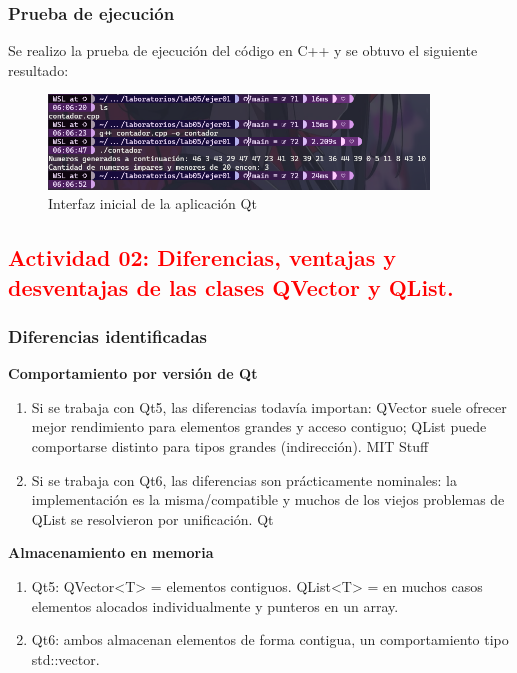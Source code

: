 \subsubsection{Prueba de ejecución}

Se realizo la prueba de ejecución del código en C++ y se obtuvo el siguiente resultado:

\begin{figure}[H]
    \centering
    \includegraphics[width=0.9\textwidth]{img/Prueba01.png}
    \caption{Interfaz inicial de la aplicación Qt}
    \label{fig:qt_app}
\end{figure}




\subsection{\textcolor{red}{Actividad 02: Diferencias, ventajas y desventajas de las clases QVector y QList.}}

\subsubsection{Diferencias identificadas}

\textbf{Comportamiento por versión de Qt}

\begin{enumerate}
    \item Si se trabaja con Qt5, las diferencias todavía importan: QVector
    suele ofrecer mejor rendimiento para elementos grandes y acceso contiguo;
    QList puede comportarse distinto para tipos grandes (indirección). MIT Stuff
    \item Si se trabaja con Qt6, las diferencias son prácticamente nominales: la
    implementación es la misma/compatible y muchos de los viejos problemas de
    QList se resolvieron por unificación. Qt
\end{enumerate}

\textbf{Almacenamiento en memoria}

\begin{enumerate}
    \item Qt5: QVector<T> = elementos contiguos. QList<T> = en muchos casos elementos alocados individualmente y punteros en un array. 
    \item Qt6: ambos almacenan elementos de forma contigua, un comportamiento tipo std::vector.
\end{enumerate}

